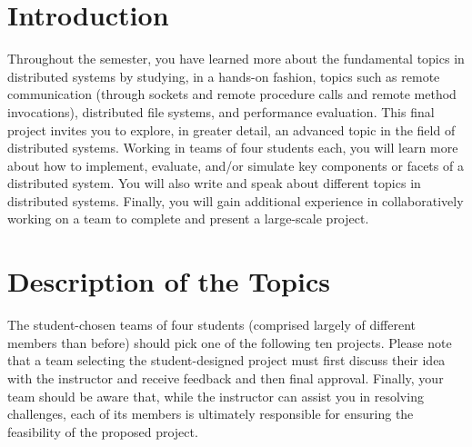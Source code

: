 

\usepackage[compact]{titlesec}


\section*{Introduction}

Throughout the semester, you have learned more about the fundamental topics in distributed systems by studying, in a
hands-on fashion, topics such as remote communication (through sockets and remote procedure calls and remote method
invocations), distributed file systems, and performance evaluation. This final project invites you to explore, in
greater detail, an advanced topic in the field of distributed systems. Working in teams of four students each, you will
learn more about how to implement, evaluate, and/or simulate key components or facets of a distributed system. You will
also write and speak about different topics in distributed systems.  Finally, you will gain additional experience in
collaboratively working on a team to complete and present a large-scale project.

\section*{Description of the Topics}

The student-chosen teams of four students (comprised largely of different members than before) should pick one of the
following ten projects.  Please note that a team selecting the student-designed project must first discuss their idea
with the instructor and receive feedback and then final approval. Finally, your team should be aware that, while the
instructor can assist you in resolving challenges, each of its members is ultimately responsible for ensuring the
feasibility of the proposed project.

